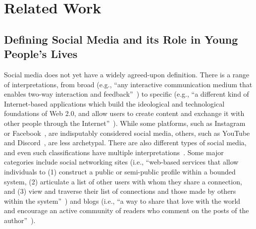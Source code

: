 \section{Related Work}
\subsection{Defining Social Media and its Role in Young People's Lives}
Social media does not yet have a widely agreed-upon definition. There is a range of interpretations, from broad (e.g., ``any interactive communication medium that enables two-way interaction and feedback''~\cite{kent2010directions}) to specific (e.g., ``a different kind of Internet-based applications which build the ideological and technological foundations of Web 2.0, and allow users to create content and exchange it with other people through the Internet''~\cite{kaplan2010users}). While some platforms, such as Instagram~\cite{instagram} or Facebook~\cite{facebook-official}, are indisputably considered social media, others, such as YouTube~\cite{youtube} and Discord~\cite{discord}, are less archetypal. There are also different types of social media, and even such classifications have multiple interpretations~\cite{kaplan2010users, sharma2018social, scott2015new}. Some major categories include social networking sites (i.e., ``web-based services that allow individuals to (1) construct a public or semi-public profile within a bounded system, (2) articulate a list of other users with whom they share a connection, and (3) view and traverse their list of connections and those made by others within the system''~\cite{Boyd-2007-SocialNetworkScholarship-i}) and blogs (i.e., ``a way to share that love with the world and encourage an active community of readers who comment on the posts of the author''~\cite{scott2015new}).

